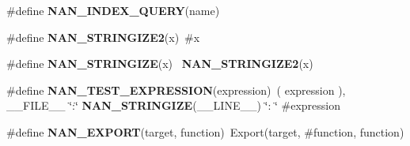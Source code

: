 \begin{DoxyCompactItemize}
\item 
\#define \textbf{ N\+A\+N\+\_\+\+I\+N\+D\+E\+X\+\_\+\+Q\+U\+E\+RY}(name)
\item 
\#define \textbf{ N\+A\+N\+\_\+\+S\+T\+R\+I\+N\+G\+I\+Z\+E2}(x)~\#x
\item 
\#define \textbf{ N\+A\+N\+\_\+\+S\+T\+R\+I\+N\+G\+I\+ZE}(x)~\textbf{ N\+A\+N\+\_\+\+S\+T\+R\+I\+N\+G\+I\+Z\+E2}(x)
\item 
\#define \textbf{ N\+A\+N\+\_\+\+T\+E\+S\+T\+\_\+\+E\+X\+P\+R\+E\+S\+S\+I\+ON}(expression)~( expression ), \+\_\+\+\_\+\+F\+I\+L\+E\+\_\+\+\_\+ \char`\"{}\+:\char`\"{} \textbf{ N\+A\+N\+\_\+\+S\+T\+R\+I\+N\+G\+I\+ZE}(\+\_\+\+\_\+\+L\+I\+N\+E\+\_\+\+\_\+) \char`\"{}\+: \char`\"{} \#expression
\item 
\#define \textbf{ N\+A\+N\+\_\+\+E\+X\+P\+O\+RT}(target,  function)~Export(target, \#function, function)
\end{DoxyCompactItemize}

